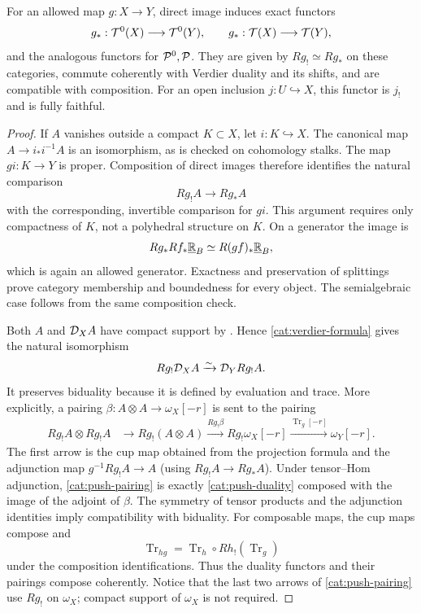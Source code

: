 \begin{proposition}
\label{prop:test-pushforward}
For an allowed map $g:X\to Y$, direct image induces exact functors
\[
 g_*:\mathcal T^0(X)\longrightarrow\mathcal T^0(Y),
 \qquad g_*:\mathcal T(X)\longrightarrow\mathcal T(Y),
\]
and the analogous functors for $\mathcal P^0,\mathcal P$.  They are given by
$Rg_!\simeq Rg_*$ on these categories, commute coherently with Verdier
duality and its shifts, and are compatible with composition.
For an open inclusion $j:U\hookrightarrow X$, this functor is $j_!$ and
is fully faithful.
\end{proposition}

\begin{proof}
If $A$ vanishes outside a compact $K\subset X$, let $i:K\hookrightarrow
X$.  The canonical map $A\to i_*i^{-1}A$ is an isomorphism, as is checked
on cohomology stalks.  The map $g i:K\to Y$ is proper.  Composition of
direct images therefore identifies the natural comparison
\[
 Rg_!A\longrightarrow Rg_*A
\]
with the corresponding, invertible comparison for $g i$.  This argument
requires only compactness of $K$, not a polyhedral structure on $K$.
On a generator the image is
\[
 Rg_*Rf_*\underline{\mathbb R}_{B}\simeq R(gf)_*\underline{\mathbb R}_{B},
\]
which is again an allowed generator.  Exactness and preservation of
splittings prove category membership and boundedness for every object.
The semialgebraic case follows from the same composition check.

Both $A$ and $\mathcal D_XA$ have compact support by
.  Hence \eqref{cat:verdier-formula} gives the
natural isomorphism
\begin{equation}
 \label{cat:push-duality}
 Rg_!\mathcal D_XA\xrightarrow{\sim}\mathcal D_Y Rg_!A.
\end{equation}
It preserves biduality because it is defined by evaluation and trace.
More explicitly, a pairing $\beta:A\otimes A\to\omega_X[-r]$ is sent
to the pairing
\begin{equation}
 \label{cat:push-pairing}
 \begin{split}
 Rg_!A\otimes Rg_!A
 &\longrightarrow Rg_!(A\otimes A)
 \xrightarrow{Rg_!\beta}Rg_!\omega_X[-r]
 \xrightarrow{\operatorname{Tr}_g[-r]}\omega_Y[-r].
 \end{split}
\end{equation}
The first arrow is the cup map obtained from the projection formula and
the adjunction map $g^{-1}Rg_!A\to A$ (using
$Rg_!A\to Rg_*A$).  Under tensor--Hom adjunction,
\eqref{cat:push-pairing} is exactly \eqref{cat:push-duality} composed
with the image of the adjoint of $\beta$.  The symmetry of tensor
products and the adjunction identities imply compatibility with
biduality.  For composable maps, the cup maps compose and
\[
 \operatorname{Tr}_{h g}
 =\operatorname{Tr}_h\circ Rh_!(\operatorname{Tr}_g)
\]
under the composition identifications.  Thus the duality functors and
their pairings compose coherently.  Notice that the last two arrows of
\eqref{cat:push-pairing} use $Rg_!$ on $\omega_X$; compact support of
$\omega_X$ is not required.


\end{proof}
